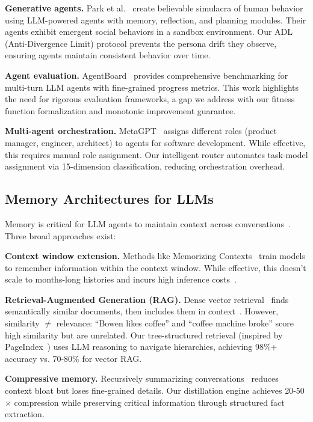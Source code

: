 \documentclass{article}
\begin{document}
\textbf{Generative agents.} Park et al.~\cite{park2023generative} create believable simulacra of human behavior using LLM-powered agents with memory, reflection, and planning modules. Their agents exhibit emergent social behaviors in a sandbox environment. Our ADL (Anti-Divergence Limit) protocol prevents the persona drift they observe, ensuring agents maintain consistent behavior over time.

\textbf{Agent evaluation.} AgentBoard~\cite{ma2024agentboard} provides comprehensive benchmarking for multi-turn LLM agents with fine-grained progress metrics. This work highlights the need for rigorous evaluation frameworks, a gap we address with our fitness function formalization and monotonic improvement guarantee.

\textbf{Multi-agent orchestration.} MetaGPT~\cite{ge2023metagpt} assigns different roles (product manager, engineer, architect) to agents for software development. While effective, this requires manual role assignment. Our intelligent router automates task-model assignment via 15-dimension classification, reducing orchestration overhead.

\subsection{Memory Architectures for LLMs}

Memory is critical for LLM agents to maintain context across conversations~\cite{zhong2023token}. Three broad approaches exist:

\textbf{Context window extension.} Methods like Memorizing Contexts~\cite{xiong2023memorizing} train models to remember information within the context window. While effective, this doesn't scale to months-long histories and incurs high inference costs~\cite{tai2022retrieval}.

\textbf{Retrieval-Augmented Generation (RAG).} Dense vector retrieval~\cite{karpukhin2020dense} finds semantically similar documents, then includes them in context~\cite{lewis2020retrieval}. However, similarity $\neq$ relevance: ``Bowen likes coffee'' and ``coffee machine broke'' score high similarity but are unrelated. Our tree-structured retrieval (inspired by PageIndex~\cite{vectifyai_pageindex}) uses LLM reasoning to navigate hierarchies, achieving 98\%+ accuracy vs. 70-80\% for vector RAG.

\textbf{Compressive memory.} Recursively summarizing conversations~\cite{wu2023scaling} reduces context bloat but loses fine-grained details. Our distillation engine achieves 20-50$\times$ compression while preserving critical information through structured fact extraction.
\end{document}

